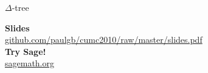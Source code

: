 \documentclass{beamer}
\theoremstyle{definition}
\theoremstyle{definition}
\begin{document}
\begin{frame}{$\Delta$-tree}

\end{frame}

\begin{frame}
\footnotesize
{}

\end{frame}


\begin{frame}
\textbf{Slides} \\
\url{github.com/paulgb/cumc2010/raw/master/slides.pdf} \\
\vspace{1.5em}
\textbf{Try Sage!} \\
\url{sagemath.org}
\end{frame}
\end{document}
